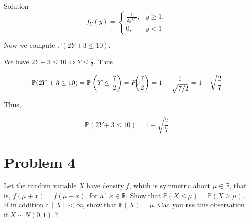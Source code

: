 \documentclass{qlnotes-export}
\begin{document}
\begin{qlsolution}{Solution}
\[f_{Y}(y) = \left\{ \begin{matrix}
{\frac{1}{2y^{3/2}},} & {y \geq 1,} \\
{0,} & {y < 1}
\end{matrix} \right.\]

Now we compute \({\mathbb{P}}(2Y + 3 \leq 10)\).

We have \(2Y + 3 \leq 10\Leftrightarrow Y \leq \frac{7}{2}\). Thus

\[{\mathbb{P}}(2Y + 3 \leq 10) = {\mathbb{P}}\left( {Y \leq \frac{7}{2}} \right) = F_{Y}\mspace{-18mu}\left( \frac{7}{2} \right) = 1 - \frac{1}{\sqrt{7/2}} = 1 - \sqrt{\frac{2}{7}}\]

Thus,

\[{\mathbb{P}}(2Y + 3 \leq 10) = 1 - \sqrt{\frac{2}{7}}\]

\end{qlsolution}

\section{Problem 4}\label{problem-4-2}

Let the random variable \(X\) have density \(f\), which is symmetric about \(\mu \in {\mathbb{R}}\), that is, \(f(\mu + x) = f(\mu - x)\), for all \(x \in {\mathbb{R}}\). Show that \({\mathbb{P}}(X \leq \mu) = {\mathbb{P}}(X \geq \mu)\). If in addition \(\left. {\mathbb{E}} \middle| X \middle| < \infty \right.\), show that \({\mathbb{E}}(X) = \mu\). Can you use this observation if \(X \sim N(0,1)\) ?
\end{document}
